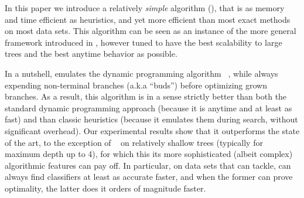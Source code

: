 \documentclass{llncs}
\begin{document}
\medskip

In this paper we introduce a relatively \emph{simple} algorithm (\budalg), that is as memory and time efficient as heuristics, and yet more efficient than most exact methods on most data sets. 
This algorithm can be seen as an instance of the more general framework introduced in \cite{DBLP:journals/corr/abs-2007-12652}, however tuned to have the best scalability to large trees and the best anytime behavior as possible.

In a nutshell, \budalg emulates the dynamic programming algorithm \dleight~\cite{dl8}, while always expending non-terminal branches (a.k.a ``buds'') before optimizing grown branches. As a result, this algorithm is in a sense strictly better than both the standard dynamic programming approach (because it is anytime and at least as fast) and than classic heuristics (because it emulates them during search, without significant overhead).
Our experimental results show that it outperforms the state of the art, to the exception of \murtree~\cite{DBLP:journals/corr/abs-2007-12652} on relatively shallow trees (typically for maximum depth up to 4), for which this its more sophisticated (albeit complex) algorithmic features can pay off.
In particular, on data sets that \dleight can tackle, \budalg can always find classifiers at least as accurate faster, and when the former can prove optimality, the latter does it orders of magnitude faster.

%
%
%
%
%
\end{document}
